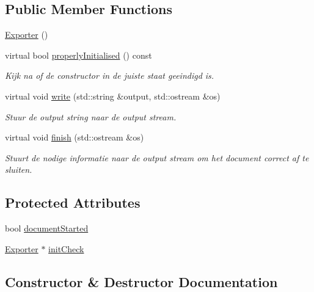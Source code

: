 \subsection*{Public Member Functions}
\begin{DoxyCompactItemize}
\item 
\hyperlink{class_exporter_a2a977cb5ac8f637fcb570e73f650eca0}{Exporter} ()
\item 
virtual bool \hyperlink{class_exporter_aafd9df9210aeefd7bb7fd434fc317cf0}{properly\+Initialised} () const
\begin{DoxyCompactList}\small\item\em Kijk na of de constructor in de juiste staat geeindigd is. \end{DoxyCompactList}\item 
virtual void \hyperlink{class_exporter_ab3736803133eb727cf87a7306f91eb11}{write} (std\+::string \&output, std\+::ostream \&os)
\begin{DoxyCompactList}\small\item\em Stuur de output string naar de output stream. \end{DoxyCompactList}\item 
virtual void \hyperlink{class_exporter_ae477714f462d70cfc5b3970f91fcc4ed}{finish} (std\+::ostream \&os)
\begin{DoxyCompactList}\small\item\em Stuurt de nodige informatie naar de output stream om het document correct af te sluiten. \end{DoxyCompactList}\end{DoxyCompactItemize}
\subsection*{Protected Attributes}
\begin{DoxyCompactItemize}
\item 
bool \hyperlink{class_exporter_a7d55f6023d5fe983512f6b02fb60733b}{document\+Started}
\item 
\hyperlink{class_exporter}{Exporter} $\ast$ \hyperlink{class_exporter_a74245e988d8e72a43704dda927acff05}{init\+Check}
\end{DoxyCompactItemize}


\subsection{Constructor \& Destructor Documentation}
\mbox{\label{class_exporter_a2a977cb5ac8f637fcb570e73f650eca0}} 

